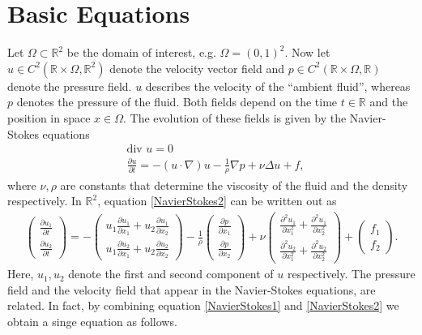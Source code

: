 \documentclass[a4paper,10pt,oneside,final,german,openbib,pdftex,titlepage]{scrbook}
\begin{document}
\section{Basic Equations}
Let $\Omega \subset \mathbb{R}^2$ be the domain of interest, e.g. $\Omega = (0,1)^2$. Now let $u \in C^2(\mathbb{R} \times \Omega,\mathbb{R}^2)$ denote the velocity vector field and $p\in C^2(\mathbb{R} \times \Omega,\mathbb{R})$ denote the pressure field. $u$ describes the velocity of the ``ambient fluid'', whereas $p$ denotes the pressure of the fluid. Both fields depend on the time $t\in \mathbb{R}$ and the position in space $x\in \Omega$. The evolution of these fields is given by the Navier-Stokes equations
\begin{align}
	&\text{div } u = 0 \label{NavierStokes1}
	\\
	&\frac{\partial u}{\partial t} = - (u \cdot \nabla)u - \frac{1}{\rho}\nabla p + \nu \Delta u + f, \label{NavierStokes2}
\end{align}
where $\nu, \rho$ are constants that determine the viscosity of the fluid and the density respectively.
In $\mathbb{R}^2$, equation \ref{NavierStokes2} can be written out as
\begin{align*}
	\left( \begin{matrix}
	\frac{\partial u_1}{\partial t} \\ \frac{\partial u_2}{\partial t}
	\end{matrix} \right) = - \left(\begin{matrix}
	u_1 \frac{\partial u_1}{\partial x_1} + u_2 \frac{\partial u_1}{\partial x_2} \\ u_1 \frac{\partial u_2}{\partial x_1} + u_2 \frac{\partial u_2}{\partial x_2}
	\end{matrix} \right)  - \frac{1}{\rho} \left( \begin{matrix}
	\frac{\partial p}{\partial x_1} \\ \frac{\partial p}{\partial x_2}
\end{matrix}\right)	 + \nu \left( \begin{matrix}
	\frac{\partial^2 u_1}{\partial x_1^2} + \frac{\partial^2 u_1}{\partial x_2^2} \\ \frac{\partial^2 u_2}{\partial x_1^2} + \frac{\partial^2 u_2}{\partial x_2^2}
	\end{matrix} \right) + \left( \begin{matrix}
	f_1 \\ f_2
	\end{matrix} \right).
\end{align*}
Here, $u_1, u_2$ denote the first and second component of $u$ respectively. The pressure field and the velocity field that appear in the Navier-Stokes equations, are related. In fact, by combining equation \ref{NavierStokes1} and \ref{NavierStokes2} we obtain a singe equation as follows.\\
\end{document}
